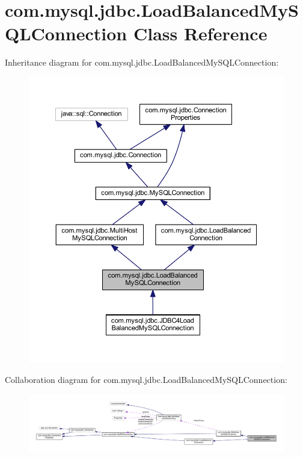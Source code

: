 \hypertarget{classcom_1_1mysql_1_1jdbc_1_1_load_balanced_my_s_q_l_connection}{}\section{com.\+mysql.\+jdbc.\+Load\+Balanced\+My\+S\+Q\+L\+Connection Class Reference}
\label{classcom_1_1mysql_1_1jdbc_1_1_load_balanced_my_s_q_l_connection}


Inheritance diagram for com.\+mysql.\+jdbc.\+Load\+Balanced\+My\+S\+Q\+L\+Connection\+:
\nopagebreak
\begin{figure}[H]
\begin{center}
\leavevmode
\includegraphics[width=350pt]{classcom_1_1mysql_1_1jdbc_1_1_load_balanced_my_s_q_l_connection__inherit__graph}
\end{center}
\end{figure}


Collaboration diagram for com.\+mysql.\+jdbc.\+Load\+Balanced\+My\+S\+Q\+L\+Connection\+:
\nopagebreak
\begin{figure}[H]
\begin{center}
\leavevmode
\includegraphics[width=350pt]{classcom_1_1mysql_1_1jdbc_1_1_load_balanced_my_s_q_l_connection__coll__graph}
\end{center}
\end{figure}

